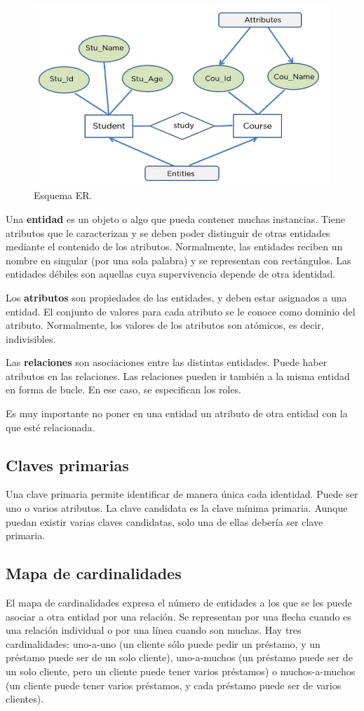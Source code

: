 \begin{figure}[htbp]
\centering
\includegraphics[width=0.5\linewidth]{figs/esquema-er.png}
\caption{Esquema ER.}
\end{figure}

Una \textbf{entidad} es un objeto o algo que pueda contener muchas instancias. Tiene atributos que le caracterizan y se deben poder distinguir de otras entidades mediante el contenido de los atributos. Normalmente, las entidades reciben un nombre en singular (por una sola palabra) y se representan con rectángulos. Las entidades débiles son aquellas cuya supervivencia depende de otra identidad.

Los \textbf{atributos} son propiedades de las entidades, y deben estar asignados a una entidad. El conjunto de valores para cada atributo se le conoce como dominio del atributo. Normalmente, los valores de los atributos son atómicos, es decir, indivisibles. 

Las \textbf{relaciones} son asociaciones entre las distintas entidades. Puede haber atributos en las relaciones. Las relaciones pueden ir también a la misma entidad en forma de bucle. En ese caso, se especifican los roles.

Es muy importante no poner en una entidad un atributo de otra entidad con la que esté relacionada.

\subsection{Claves primarias}
Una clave primaria permite identificar de manera única cada identidad. Puede ser uno o varios atributos. La clave candidata es la clave mínima primaria. Aunque puedan existir varias claves candidatas, solo una de ellas debería ser clave primaria. 

\subsection{Mapa de cardinalidades}
El mapa de cardinalidades expresa el número de entidades a los que se les puede asociar a otra entidad por una relación. Se representan por una flecha cuando es una relación individual o por una línea cuando son muchas. Hay tres cardinalidades: uno-a-uno (un cliente sólo puede pedir un préstamo, y un préstamo puede ser de un solo cliente), uno-a-muchos (un préstamo puede ser de un solo cliente, pero un cliente puede tener varios préstamos) o muchos-a-muchos (un cliente puede tener varios préstamos, y cada préstamo puede ser de varios clientes). 

